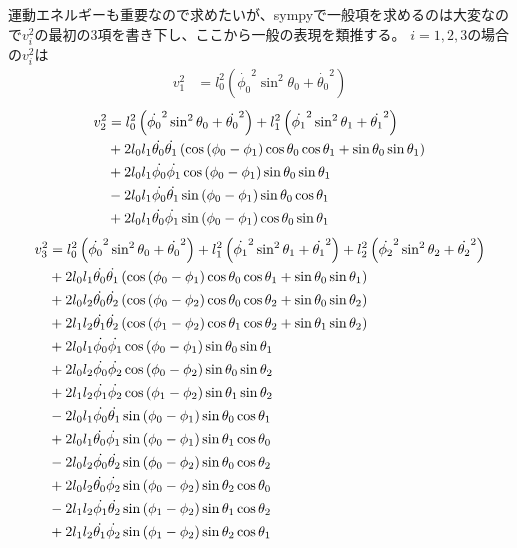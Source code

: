 \documentclass{jsarticle}
\newcommand{\eqa}[1]{\begin{align}#1\end{align}}
\begin{document}
運動エネルギーも重要なので求めたいが、sympyで一般項を求めるのは大変なので$v^2_i$の最初の3項を書き下し、ここから一般の表現を類推する。
$i=1,2,3$の場合の$v^2_i$は
\eqa{
	v^2_1 &= l_0^2 \left(\dot{\phi_0}^2\sin^2{\theta_0} + \dot{\theta_0}^2\right)
}
\eqa{
	v^2_2 &= l_0^2 \left(\dot{\phi_0}^2\sin^2{\theta_0} + \dot{\theta_0}^2\right) + l_1^2 \left(\dot{\phi_1}^2\sin^2{\theta_1} + \dot{\theta_1}^2\right) \notag\\
		&+ 2 l_0 l_1 \dot{\theta_0} \dot{\theta_1} \left(\cos{\left (\phi_0 - \phi_1 \right )} \cos{\theta_0} \cos{\theta_1} + \sin{\theta_0} \sin{\theta_1} \right) \notag\\
		&+ 2 l_0 l_1 \dot{\phi_0} \dot{\phi_1} \cos{\left (\phi_0 - \phi_1 \right )} \sin{\theta_0} \sin{\theta_1} \notag\\
		&- 2 l_0 l_1 \dot{\phi_0} \dot{\theta_1} \sin{\left (\phi_0 - \phi_1 \right )} \sin{\theta_0} \cos{\theta_1} \notag\\
		&+ 2 l_0 l_1 \dot{\theta_0} \dot{\phi_1} \sin{\left (\phi_0 - \phi_1 \right )} \cos{\theta_0} \sin{\theta_1}
}
\eqa{
	v^2_3 &= l_0^2 \left(\dot{\phi_0}^2\sin^2{\theta_0} + \dot{\theta_0}^2\right)
		+ l_1^2 \left(\dot{\phi_1}^2 \sin^2{\theta_1} + \dot{\theta_1}^2 \right)
		+ l_2^2 \left(\dot{\phi_2}^2 \sin^2{\theta_2} + \dot{\theta_2}^2\right) \notag\\
		&+ 2 l_0 l_1 \dot{\theta_0} \dot{\theta_1} \left(\cos{\left (\phi_0 - \phi_1 \right )} \cos{\theta_0} \cos{\theta_1} + \sin{\theta_0} \sin{\theta_1}\right) \notag\\
		&+ 2 l_0 l_2 \dot{\theta_0} \dot{\theta_2} \left(\cos{\left (\phi_0 - \phi_2 \right )} \cos{\theta_0} \cos{\theta_2} + \sin{\theta_0} \sin{\theta_2}\right) \notag\\
		&+ 2 l_1 l_2 \dot{\theta_1} \dot{\theta_2} \left(\cos{\left (\phi_1 - \phi_2 \right )} \cos{\theta_1} \cos{\theta_2} + \sin{\theta_1} \sin{\theta_2}\right) \notag\\
		&+ 2 l_0 l_1 \dot{\phi_0} \dot{\phi_1} \cos{\left (\phi_0 - \phi_1 \right )} \sin{\theta_0} \sin{\theta_1} \notag\\
		&+ 2 l_0 l_2 \dot{\phi_0} \dot{\phi_2} \cos{\left (\phi_0 - \phi_2 \right )} \sin{\theta_0} \sin{\theta_2} \notag\\
		&+ 2 l_1 l_2 \dot{\phi_1} \dot{\phi_2} \cos{\left (\phi_1 - \phi_2 \right )} \sin{\theta_1} \sin{\theta_2} \notag\\
		&- 2 l_0 l_1 \dot{\phi_0} \dot{\theta_1} \sin{\left (\phi_0 - \phi_1 \right )} \sin{\theta_0} \cos{\theta_1} \notag\\
		&+ 2 l_0 l_1 \dot{\theta_0} \dot{\phi_1}\sin{\left (\phi_0 - \phi_1 \right )} \sin{\theta_1} \cos{\theta_0} \notag\\
		&- 2 l_0 l_2 \dot{\phi_0} \dot{\theta_2}\sin{\left (\phi_0 - \phi_2 \right )} \sin{\theta_0} \cos{\theta_2} \notag\\
		&+ 2 l_0 l_2 \dot{\theta_0} \dot{\phi_2} \sin{\left (\phi_0 - \phi_2 \right )} \sin{\theta_2} \cos{\theta_0} \notag\\
		&- 2 l_1 l_2 \dot{\phi_1} \dot{\theta_2} \sin{\left (\phi_1 - \phi_2 \right )} \sin{\theta_1} \cos{\theta_2}  \notag\\
		&+ 2 l_1 l_2 \dot{\theta_1} \dot{\phi_2} \sin{\left (\phi_1 - \phi_2 \right )} \sin{\theta_2} \cos{\theta_1}
}
\end{document}
